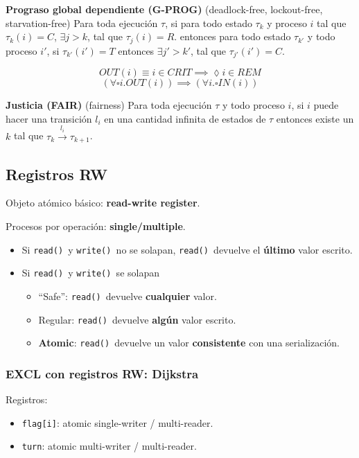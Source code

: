 \documentclass[11pt, spanish]{report}
\newcommand{\transition}{l}
\newcommand{\globally}{\square}
\newcommand{\finally}{\lozenge}
\newcommand{\readf}{\texttt{read()\,}}
\newcommand{\writef}{\texttt{write()\,}}
\begin{document}
\textbf{Prograso global dependiente (G-PROG)} (deadlock-free, lockout-free, starvation-free)
Para toda ejecución $\tau$,
si para todo estado $\tau_k$ y proceso $i$ tal que $\tau_k(i) = C$,
  $\exists j > k$, tal que $\tau_j(i) = R$.
entonces para todo estado $\tau_{k'}$ y todo proceso $i'$,
  si $\tau_{k'}(i') = T$
  entonces $\exists j' > k'$, tal que $\tau_{j'}(i') = C$.

\[OUT(i) \equiv i \in CRIT \implies \finally i \in REM\]
\[(\forall \globally i. OUT(i)) \implies (\forall i . \globally IN(i))\]

\textbf{Justicia (FAIR)} (fairness)
Para toda ejecución $\tau$ y todo proceso $i$,
si $i$ puede hacer una transición $\transition_i$ en una cantidad infinita de estados de $\tau$
entonces existe un $k$ tal que $\tau_k \xrightarrow{\transition_i} \tau_{k+1}$.

\subsection{Registros RW}
Objeto atómico básico: \textbf{read-write register}.

Procesos por operación: \textbf{single/multiple}.

\begin{itemize}
  \item Si \readf y \writef no se solapan, \readf devuelve el \textbf{último} valor escrito.
  \item Si \readf y \writef se solapan \begin{itemize}
      \item ``Safe'': \readf devuelve \textbf{cualquier} valor.
      \item Regular: \readf devuelve \textbf{algún} valor escrito.
      \item \textbf{Atomic}: \readf devuelve un valor \textbf{consistente} con una serialización.
    \end{itemize}
\end{itemize}

\subsubsection{EXCL con registros RW: Dijkstra}
Registros:
\begin{itemize}
  \item \texttt{flag[i]}: atomic single-writer / multi-reader.
  \item \texttt{turn}: atomic multi-writer / multi-reader.
\end{itemize}
\end{document}
